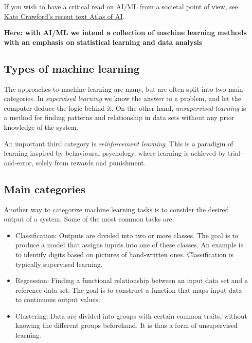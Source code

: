 \documentclass[%
oneside,                 %
final,                   %
10pt]{article}
\begin{document}
\noindent
If you wish to have a critical read on AI/ML from a societal point of view, see \href{{https://www.katecrawford.net/}}{Kate Crawford's recent text Atlas of AI}. 

\textbf{Here: with AI/ML we intend a collection of machine learning methods with an emphasis on statistical learning and data analysis}

\subsection{Types of machine learning}

\begin{block}{}
The approaches to machine learning are many, but are often split into two main categories. 
In \emph{supervised learning} we know the answer to a problem,
and let the computer deduce the logic behind it. On the other hand, \emph{unsupervised learning}
is a method for finding patterns and relationship in data sets without any prior knowledge of the system.

An important  third category is  \emph{reinforcement learning}. This is a paradigm 
of learning inspired by behavioural psychology, where learning is achieved by trial-and-error, 
solely from rewards and punishment.
\end{block}

\subsection{Main categories}
\begin{block}{}
Another way to categorize machine learning tasks is to consider the desired output of a system.
Some of the most common tasks are:

\begin{itemize}
\item Classification: Outputs are divided into two or more classes. The goal is to   produce a model that assigns inputs into one of these classes. An example is to identify  digits based on pictures of hand-written ones. Classification is typically supervised learning.

\item Regression: Finding a functional relationship between an input data set and a reference data set.   The goal is to construct a function that maps input data to continuous output values.

\item Clustering: Data are divided into groups with certain common traits, without knowing the different groups beforehand.  It is thus a form of unsupervised learning.
\end{itemize}

\noindent
\end{block}
\end{document}
